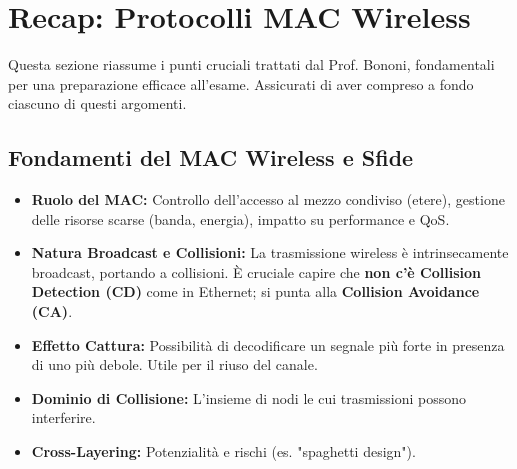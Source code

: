 \section{Recap: Protocolli MAC Wireless}
Questa sezione riassume i punti cruciali trattati dal Prof. Bononi, fondamentali per una preparazione efficace all'esame. Assicurati di aver compreso a fondo ciascuno di questi argomenti.

\subsection{Fondamenti del MAC Wireless e Sfide}
\begin{itemize}
    \item \textbf{Ruolo del MAC:} Controllo dell'accesso al mezzo condiviso (etere), gestione delle risorse scarse (banda, energia), impatto su performance e QoS.
    \item \textbf{Natura Broadcast e Collisioni:} La trasmissione wireless è intrinsecamente broadcast, portando a collisioni. È cruciale capire che \textbf{non c'è Collision Detection (CD)} come in Ethernet; si punta alla \textbf{Collision Avoidance (CA)}.
    \item \textbf{Effetto Cattura:} Possibilità di decodificare un segnale più forte in presenza di uno più debole. Utile per il riuso del canale.
    \item \textbf{Dominio di Collisione:} L'insieme di nodi le cui trasmissioni possono interferire.
    \item \textbf{Cross-Layering:} Potenzialità e rischi (es. "spaghetti design").
\end{itemize}

